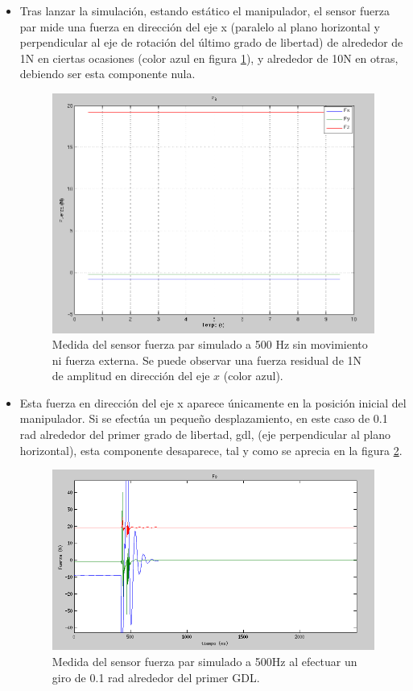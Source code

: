 \begin{itemize}
\item Tras lanzar la simulación, estando estático el manipulador, el sensor fuerza par mide una fuerza en dirección del eje x (paralelo al plano horizontal y perpendicular al eje de rotación del último grado de libertad) de alrededor de 1N en ciertas ocasiones (color azul en figura \ref{fig:errorFTsensor1}), y alrededor de 10N en otras, debiendo ser esta componente nula.

\begin{figure}[h!]
\centering
\includegraphics[scale=0.6]{Figuras/FTerror1}
\caption{Medida del sensor fuerza par simulado a 500 Hz sin movimiento ni fuerza externa. Se puede observar una fuerza residual de 1N de amplitud en dirección del eje $x$ (color azul).}
\label{fig:errorFTsensor1}
\end{figure}

\item Esta fuerza en dirección del eje x aparece únicamente en la posición inicial del manipulador. Si se efectúa un pequeño desplazamiento, en este caso de 0.1 rad alrededor del primer grado de libertad, \acrshort{gdl}, (eje perpendicular al plano horizontal), esta componente desaparece, tal y como se aprecia en la figura \ref{fig:errorFTsensor2}.

\begin{figure}[h!]
\centering
\includegraphics[scale=0.5]{Figuras/FTerror2}
\caption{Medida del sensor fuerza par simulado a 500Hz al efectuar un giro de 0.1 rad alrededor del primer GDL.}
\label{fig:errorFTsensor2}
\end{figure}


\end{itemize}
